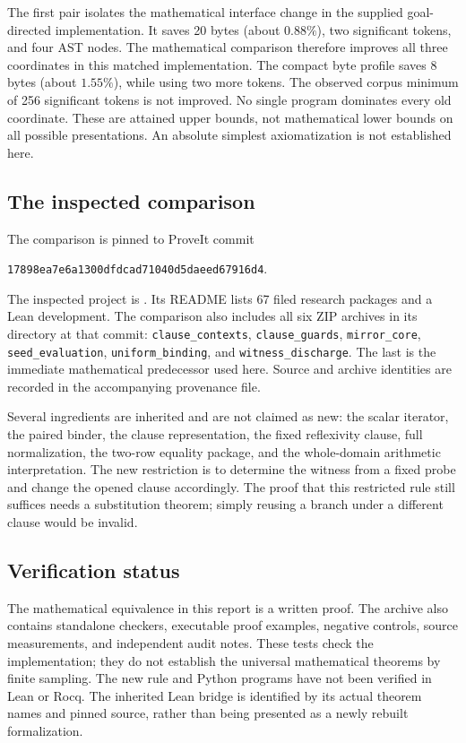 The first pair isolates the mathematical interface change in the supplied
goal-directed implementation.  It saves 20 bytes (about $0.88\%$), two significant tokens, and four
AST nodes. The mathematical comparison therefore improves all three
coordinates in this matched implementation.  The compact byte
profile saves 8 bytes (about $1.55\%$), while using two more tokens.
The observed corpus minimum of 256 significant tokens is not improved.
No single program dominates every old coordinate.  These are attained
upper bounds, not mathematical lower bounds on all possible presentations.
An absolute simplest axiomatization is not established here.

\subsection{The inspected comparison}

The comparison is pinned to ProveIt commit
\begin{center}
\texttt{17898ea7e6a1300dfdcad71040d5daeed67916d4}.
\end{center}
The inspected project is
.
Its README lists 67 filed research packages and a Lean development.\cite{baseline}
The comparison also includes all six ZIP archives in its
 directory at that commit:
\texttt{clause\_contexts}, \texttt{clause\_guards},
\texttt{mirror\_core}, \texttt{seed\_evaluation},
\texttt{uniform\_binding}, and \texttt{witness\_discharge}.
The last is the immediate mathematical predecessor used here.\cite{wd} Source and
archive identities are recorded in the accompanying provenance file.

Several ingredients are inherited and are not claimed as new:
the scalar iterator, the paired binder, the clause representation, the
fixed reflexivity clause, full normalization, the two-row equality package,
and the whole-domain arithmetic interpretation.  The new restriction is to
determine the witness from a fixed probe and change the opened clause
accordingly.  The proof that this restricted rule still suffices needs a
substitution theorem; simply reusing a branch under a different clause
would be invalid.

\subsection{Verification status}

The mathematical equivalence in this report is a written proof.  The archive
also contains standalone checkers, executable proof examples, negative
controls, source measurements, and independent audit notes.  These tests
check the implementation; they do not establish the universal mathematical
theorems by finite sampling.  The new rule and Python programs have not been
verified in Lean or Rocq.  The inherited Lean bridge is identified by its
actual theorem names and pinned source, rather than being presented as a
newly rebuilt formalization.

